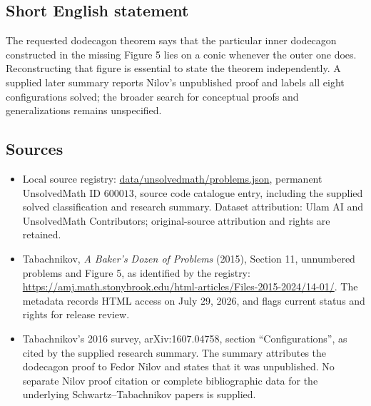 \documentclass[11pt]{article}
\begin{document}
\subsection{Short English statement}
The requested dodecagon theorem says that the particular inner dodecagon constructed in the missing Figure 5 lies on a conic whenever the outer one does. Reconstructing that figure is essential to state the theorem independently. A supplied later summary reports Nilov's unpublished proof and labels all eight configurations solved; the broader search for conceptual proofs and generalizations remains unspecified.
\subsection{Sources}
\begin{itemize}
\item Local source registry: \url{data/unsolvedmath/problems.json}, permanent UnsolvedMath ID $600013$, source code catalogue entry, including the supplied solved classification and research summary. Dataset attribution: Ulam AI and UnsolvedMath Contributors; original-source attribution and rights are retained.
\item Tabachnikov, \emph{A Baker's Dozen of Problems} (2015), Section 11, unnumbered problems and Figure 5, as identified by the registry: \url{https://amj.math.stonybrook.edu/html-articles/Files-2015-2024/14-01/}. The metadata records HTML access on July 29, 2026, and flags current status and rights for release review.
\item Tabachnikov's 2016 survey, arXiv:1607.04758, section ``Configurations'', as cited by the supplied research summary. The summary attributes the dodecagon proof to Fedor Nilov and states that it was unpublished. No separate Nilov proof citation or complete bibliographic data for the underlying Schwartz--Tabachnikov papers is supplied.
\end{itemize}
\end{document}
